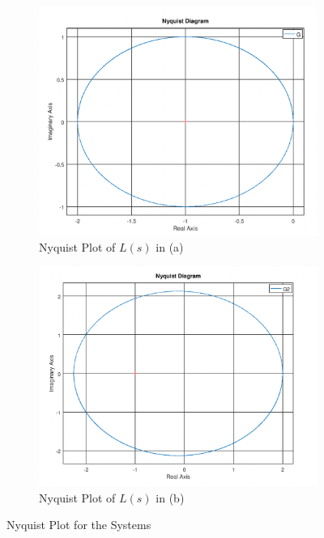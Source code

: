 \documentclass[12pt]{article}
\begin{document}
\begin{figure}[H]
    \centering
    \begin{subfigure}[b]{0.45\textwidth}
    \centering
    \includegraphics[width=\textwidth]{figs/8.5-1.png}
     \caption{Nyquist Plot of $L(s)$ in (a)}
     \end{subfigure}
     \begin{subfigure}[b]{0.46\textwidth}
     \centering
        \includegraphics[width=\textwidth]{figs/8.5-2.png}
     \caption{Nyquist Plot of $L(s)$ in (b)}
     \end{subfigure}
    \caption{Nyquist Plot for the Systems}\label{fig:prb14}
\end{figure}
\end{document}
